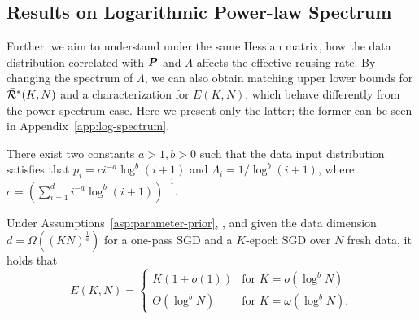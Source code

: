 \subsection{Results on Logarithmic Power-law Spectrum}\label{sec:log-power-spectrum}


Further, we aim to understand under the same Hessian matrix, how the data distribution correlated with ${\bm{P}}$ and $\Lambda$ affects the effective reusing rate. By changing the spectrum of $\Lambda$, we can also obtain matching upper lower bounds for $\Bar{\mathcal{R}}^*(K,N)$ and a characterization for $E(K,N)$, which behave differently from the power-spectrum case. Here we present only the latter; the former can be seen in Appendix~\ref{app:log-spectrum}. 


\begin{assumption} \label{asp:log-power-decay-prior}
    There exist two constants $a>1,b>0$ such that the data input distribution satisfies that $p_i = c i^{-a} \log^b (i+1)$ and $\Lambda_i = 1/{\log^b (i+1)}$, where $c = \left(\sum_{i=1}^d i^{-a}{\log^b (i+1)}\right)^{-1}$.
\end{assumption}

\begin{theorem} \label{thm:one-hot-E_K-log-spectrum}
     Under Assumptions~\ref{asp:parameter-prior}, , and given the data dimension $d = \Omega((KN)^{\frac{1}{a}})$ for a one-pass SGD and a $K$-epoch SGD over $N$ fresh data, it holds that
    \[
    E(K, N) = 
    \begin{cases}
         K(1 + o(1)) & \text{for }  K = o(\log^b N) \\
         \Theta(\log^b N) & \text{for } K = \omega(\log^b N).
    \end{cases}
    \]
\end{theorem}

